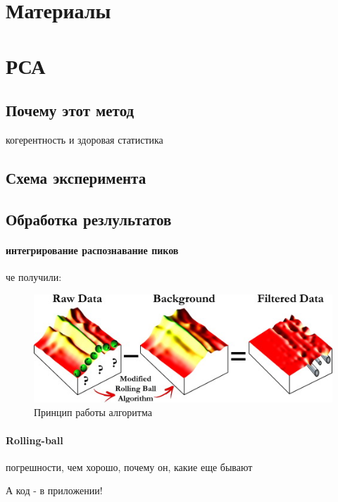 

	\section{Материалы}
	
	
	
	\section{РСА}
	
	\subsection{Почему этот метод}
	когерентность и здоровая статистика
	
	
	\subsection{Схема эксперимента}
	
	
	
	\subsection{Обработка резлультатов}
	
	\paragraph{интегрирование распознавание пиков}
	че получили:
		\begin{figure}
    \includegraphics[width=\textwidth]{fig/rolling-ball.jpg}
    \caption{Принцип работы алгоритма}
    \label{fig:rolling-ball}
\end{figure}
	
	\paragraph{Rolling-ball}
	погрешности, чем хорошо, почему он, какие еще бывают
	
	А код - в приложении!
	
